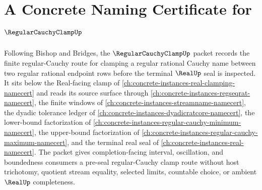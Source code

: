 \chapter{A Concrete Naming Certificate for $\RegularCauchyClampUp$}
\label{ch:concrete-instances-regular-cauchy-clamp-namecert}

Following Bishop and Bridges, the $\RegularCauchyClampUp$ packet records the finite regular-Cauchy route for clamping a regular rational Cauchy name between two regular rational endpoint rows before the terminal $\RealUp$ seal is inspected. It sits below the Real-facing clamp of \autoref{ch:concrete-instances-real-clamping-namecert} and reads its source surface through \autoref{ch:concrete-instances-regseqrat-namecert}, the finite windows of \autoref{ch:concrete-instances-streamname-namecert}, the dyadic tolerance ledger of \autoref{ch:concrete-instances-dyadicratcore-namecert}, the lower-bound factorization of \autoref{ch:concrete-instances-regular-cauchy-minimum-namecert}, the upper-bound factorization of \autoref{ch:concrete-instances-regular-cauchy-maximum-namecert}, and the terminal real seal of \autoref{ch:concrete-instances-real-namecert}. The packet gives completion-facing interval, oscillation, and boundedness consumers a pre-seal regular-Cauchy clamp route without host trichotomy, quotient stream equality, selected limits, countable choice, or ambient $\RealUp$ completeness.

